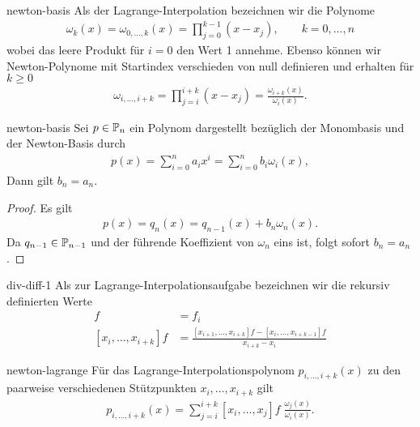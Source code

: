 \begin{Definition}{newton-basis}
  Als  der Lagrange-Interpolation bezeichnen wir
  die Polynome
  \begin{gather}
    \omega_k(x)
    = \omega_{0,\dots,k}(x)
    = \prod_{j=0}^{k-1} (x-x_j),
    \qquad k=0,\dots,n
  \end{gather}
  wobei das leere Produkt für $i=0$ den Wert 1 annehme. Ebenso können
  wir Newton-Polynome mit Startindex verschieden von null definieren
  und erhalten für $k\ge 0$
  \begin{gather}
    \omega_{i,\dots,i+k} = \prod_{j=i}^{i+k} (x-x_j)
    = \frac{\omega_{i+k}(x)}{\omega_i(x)}.
  \end{gather}
\end{Definition}

\begin{Lemma}{newton-basis}
  Sei $p \in \P_n$ ein Polynom dargestellt bezüglich der Monombasis
  und der Newton-Basis durch
  \begin{gather}
    p(x) = \sum_{i=0}^n a_i x^i = \sum_{i=0}^n b_i \omega_i(x),
  \end{gather}
  Dann gilt $b_n = a_n$.
\end{Lemma}

\begin{proof}
  Es gilt
  \begin{gather}
    p(x) = q_n(x) = q_{n-1}(x) + b_n \omega_n(x).
  \end{gather}
  Da $q_{n-1}\in \P_{n-1}$ und der führende Koeffizient von $\omega_n$ eins ist, folgt sofort $b_n = a_n$.
\end{proof}

\begin{Definition}{div-diff-1}
  Als  zur
  Lagrange-Interpolationsaufgabe bezeichnen wir die rekursiv
  definierten Werte
  \begin{align}
    [x_i]f
    &= f_i \\
    [x_i,\dots,x_{i+k}]f
    &= \frac{[x_{i+1},\dots,x_{i+k}]f - [x_i,\dots,x_{i+k-1}]f}{x_{i+k}-x_i}
  \end{align}
\end{Definition}

\begin{Satz}{newton-lagrange}
  Für das Lagrange-Interpolationspolynom $p_{i,\dots,i+k}(x)$ zu den
  paarweise verschiedenen Stützpunkten $x_i,\dots,x_{i+k}$ gilt
  \begin{gather}
    p_{i,\dots,i+k}(x)
    = \sum_{j=i}^{i+k} [x_i,\dots,x_{j}]f\; \frac{\omega_j(x)}{\omega_i(x)}.
  \end{gather}
\end{Satz}

